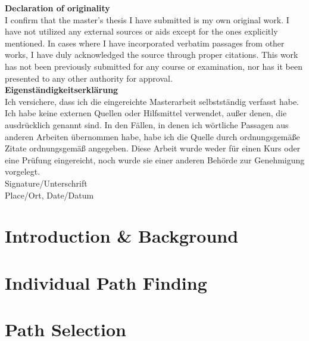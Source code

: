 \documentclass{report}
\theoremstyle{definition}
\begin{document}
\newpage

\indent \textbf{Declaration of originality} \\
\noindent I confirm that the master's thesis I have submitted is my own original work. I have not utilized any external sources or aids except for the ones explicitly mentioned. In cases where I have incorporated verbatim passages from other works, I have duly acknowledged the source through proper citations. This work has not been previously submitted for any course or examination, nor has it been presented to any other authority for approval. \\[1cm]

\indent \textbf{Eigenständigkeitserklärung} \\
\noindent Ich versichere, dass ich die eingereichte Masterarbeit selbstständig verfasst habe. Ich habe keine externen Quellen oder Hilfsmittel verwendet, außer denen, die ausdrücklich genannt sind. In den Fällen, in denen ich wörtliche Passagen aus anderen Arbeiten übernommen habe, habe ich die Quelle durch ordnungsgemäße Zitate ordnungsgemäß angegeben. Diese Arbeit wurde weder für einen Kurs oder eine Prüfung eingereicht, noch wurde sie einer anderen Behörde zur Genehmigung vorgelegt. \\[2cm]



\indent Signature/Unterschrift \\[1.2cm]

\indent Place/Ort, Date/Datum

\newpage
\tableofcontents

\listoffigures

\lstlistoflistings
\newpage







\chapter{Introduction \& Background}




\chapter{Individual Path Finding}


\chapter{Path Selection}

\end{document}
